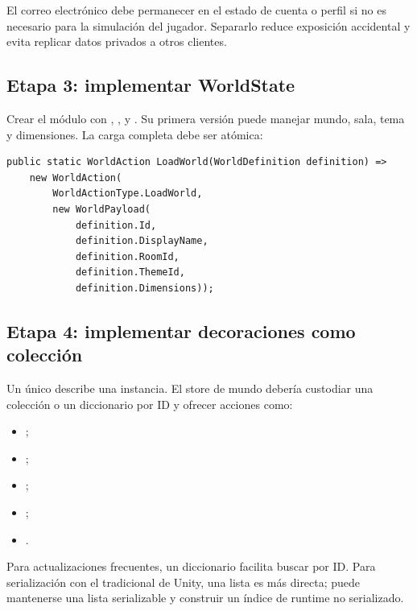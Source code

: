 El correo electrónico debe permanecer en el estado de cuenta o perfil si no es necesario para la simulación del jugador. Separarlo reduce exposición accidental y evita replicar datos privados a otros clientes.

\subsection{Etapa 3: implementar WorldState}

Crear el módulo  con , ,  y . Su primera versión puede manejar mundo, sala, tema y dimensiones. La carga completa debe ser atómica:

\begin{lstlisting}[caption={Ejemplo de acción compuesta para cargar un mundo}]
public static WorldAction LoadWorld(WorldDefinition definition) =>
    new WorldAction(
        WorldActionType.LoadWorld,
        new WorldPayload(
            definition.Id,
            definition.DisplayName,
            definition.RoomId,
            definition.ThemeId,
            definition.Dimensions));
\end{lstlisting}

\subsection{Etapa 4: implementar decoraciones como colección}

Un único  describe una instancia. El store de mundo debería custodiar una colección o un diccionario por ID y ofrecer acciones como:

\begin{itemize}
  \item {};
  \item {};
  \item {};
  \item {};
  \item {}.
\end{itemize}

Para actualizaciones frecuentes, un diccionario facilita buscar por ID. Para serialización con el  tradicional de Unity, una lista es más directa; puede mantenerse una lista serializable y construir un índice de runtime no serializado.

